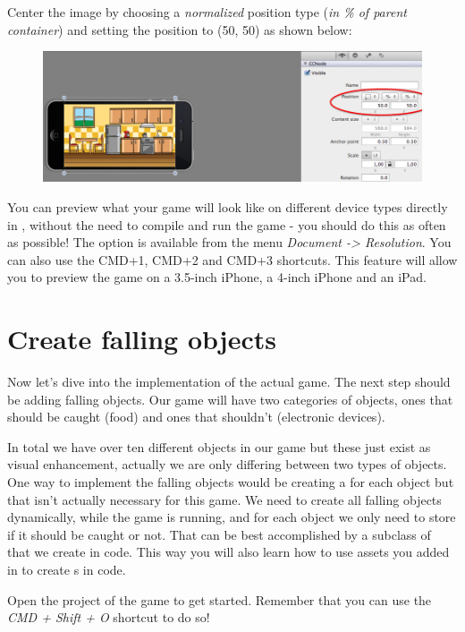 \begin{leftbar}
Center the image by choosing a \textit{normalized} position type (\textit{in \%
of parent container}) and setting the position to (50, 50) as shown below:
\begin{figure}[H]
    \centering
    \includegraphics[width=0.9\linewidth]{images/Chapter2/center_background.png}
\end{figure}
\end{leftbar}

You can preview what your game will look like on different device types directly
in \SB{}, without the need to compile and run the game - you should do this as
often as possible! The option is available from the menu \textit{Document ->
Resolution}. You can also use the CMD+1, CMD+2 and CMD+3 shortcuts. This feature
will allow you to preview the game on a 3.5-inch iPhone, a 4-inch iPhone and an
iPad. \label{preview_screen_sizes}

\section{Create falling objects}
Now let's dive into the implementation of the actual game. The next step should
be adding falling objects. Our game will have two categories of objects, ones
that should be caught (food) and ones that shouldn't (electronic devices).

In total we have over ten different objects in our game but these just exist as
visual enhancement, actually we are only differing between two types of objects.
One way to implement the falling objects would be creating a \ccbfile{} for each
object but that isn't actually necessary for this game. We need to create all
falling objects dynamically, while the game is running, and for each object we
only need to store if it should be caught or not. That can be best accomplished
by a subclass of \ccsprite{} that we create in code. This way you will also
learn how to use assets you added in \SB{} to create \ccsprite{}s in code.
\begin{leftbar}
Open the \xcode{} project of the game to get started. Remember that you can use
the \textit{CMD + Shift + O} shortcut to do so!
\end{leftbar}

